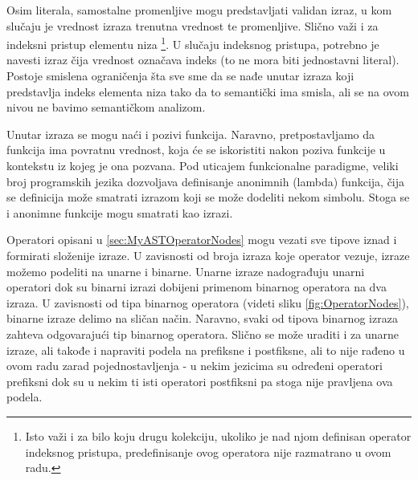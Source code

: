 Osim literala, samostalne promenljive mogu predstavljati validan izraz, u kom slučaju je vrednost izraza trenutna vrednost te promenljive. Slično važi i za indeksni pristup elementu niza \footnote{Isto važi i za bilo koju drugu kolekciju, ukoliko je nad njom definisan operator indeksnog pristupa, predefinisanje ovog operatora nije razmatrano u ovom radu.}. U slučaju indeksnog pristupa, potrebno je navesti izraz čija vrednost označava indeks (to ne mora biti jednostavni literal). Postoje smislena ograničenja šta sve sme da se nađe unutar izraza koji predstavlja indeks elementa niza tako da to semantički ima smisla, ali se na ovom nivou ne bavimo semantičkom analizom. 

Unutar izraza se mogu naći i pozivi funkcija. Naravno, pretpostavljamo da funkcija ima povratnu vrednost, koja će se iskoristiti nakon poziva funkcije u kontekstu iz kojeg je ona pozvana. Pod uticajem funkcionalne paradigme, veliki broj programskih jezika dozvoljava definisanje anonimnih (lambda) funkcija, čija se definicija može smatrati izrazom koji se može dodeliti nekom simbolu. Stoga se i anonimne funkcije mogu smatrati kao izrazi. 

Operatori opisani u \ref{sec:MyASTOperatorNodes} mogu vezati sve tipove iznad i formirati složenije izraze. U zavisnosti od broja izraza koje operator vezuje, izraze možemo podeliti na unarne i binarne. Unarne izraze nadograđuju unarni operatori dok su binarni izrazi dobijeni primenom binarnog operatora na dva izraza. U zavisnosti od tipa binarnog operatora (videti sliku \ref{fig:OperatorNodes}), binarne izraze delimo na sličan način. Naravno, svaki od tipova binarnog izraza zahteva odgovarajući tip binarnog operatora. Slično se može uraditi i za unarne izraze, ali takođe i napraviti podela na prefiksne i postfiksne, ali to nije rađeno u ovom radu zarad pojednostavljenja - u nekim jezicima su određeni operatori prefiksni dok su u nekim ti isti operatori postfiksni pa stoga nije pravljena ova podela.

